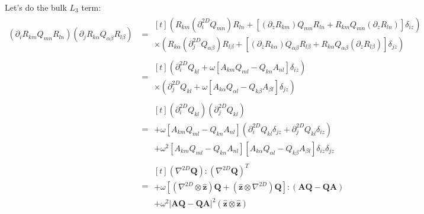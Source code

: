 \documentclass[reqno]{article}
\newcommand{\Q}{\mathbf{Q}}
\newcommand{\A}{\mathbf{A}}
\newcommand{\z}{\mathbf{\hat{z}}}
\begin{document}
Let's do the bulk $L_3$ term:
\begin{equation}
\begin{split}
    \left( \partial_i R_{km} Q_{mn} R_{ln} \right) \left( \partial_j R_{k\alpha} Q_{\alpha \beta} R_{l\beta} \right)
    &=
    \begin{multlined}[t]
    \left( 
        R_{km} (\partial_i^{2D} Q_{mn}) R_{ln}
        + \left[
            (\partial_z R_{km}) Q_{mn} R_{ln}
            + R_{km} Q_{mn} (\partial_z R_{ln} )
        \right] \delta_{iz}
    \right) \\
    \times \left( 
        R_{k\alpha } (\partial_j^{2D} Q_{\alpha \beta}) R_{l\beta}
        + \left[
            (\partial_z R_{k\alpha }) Q_{\alpha \beta} R_{l\beta}
            + R_{k\alpha } Q_{\alpha \beta} (\partial_z R_{l\beta} )
        \right] \delta_{jz}
    \right) 
    \end{multlined} \\
    &=
    \begin{multlined}[t]
    \left( 
        \partial_i^{2D} Q_{kl}
        + \omega \left[
            A_{km} Q_{ml} 
            - Q_{kn} A_{nl}
        \right] \delta_{iz}
    \right) \\
    \times \left( 
        \partial_j^{2D} Q_{k l}
        + \omega \left[
            A_{k \alpha} Q_{\alpha l}
            - Q_{k \beta} A_{\beta l}
        \right] \delta_{jz}
    \right) 
    \end{multlined} \\
    &=
    \begin{multlined}[t]
        \left(\partial_i^{2D} Q_{kl} \right)
        \left( \partial_j^{2D} Q_{kl} \right) \\
        + 
        \omega \left[
            A_{km} Q_{ml} 
            - Q_{kn} A_{nl}
        \right] 
        \left( 
            \partial_i^{2D} Q_{kl} \delta_{jz}
            + \partial_j^{2D} Q_{kl} \delta_{iz}
        \right) \\
         +
         \omega^2 \left[
             A_{km} Q_{ml} 
             - Q_{kn} A_{nl}
         \right]
         \left[
             A_{k\alpha} Q_{\alpha l} 
             - Q_{k\beta} A_{\beta l}
         \right] \delta_{iz} \delta_{jz}
    \end{multlined} \\
    &=
    \begin{multlined}[t]
        \left( \nabla^{2D} \Q \right) : \left( \nabla^{2D} \Q \right)^T \\
        + \omega \left[ \left( \nabla^{2D} \otimes \z \right) \Q 
            + \left( \z \otimes \nabla^{2D} \right) \Q
        \right] : \left( \A \Q - \Q \A \right)  \\
        + \omega^2 \left| \A \Q - \Q \A \right|^2 \left( \z \otimes \z \right)
    \end{multlined}
\end{split}
\end{equation}
\end{document}
